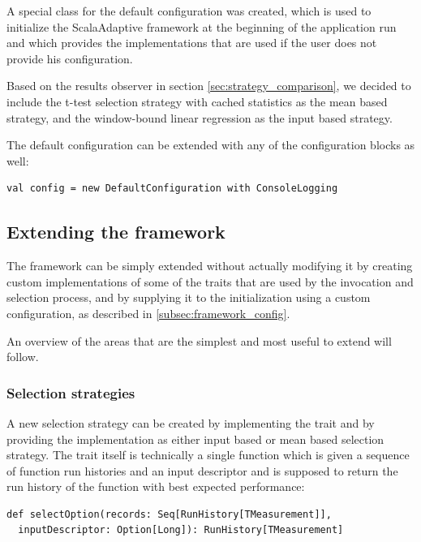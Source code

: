 A special class for the default configuration was created, which is used to initialize the ScalaAdaptive framework at the beginning of the application run and which provides the implementations that are used if the user does not provide his configuration.

Based on the results observer in section \ref{sec:strategy_comparison}, we decided to include the t-test selection strategy with cached statistics as the mean based strategy, and the window-bound linear regression as the input based strategy.

The default configuration can be extended with any of the configuration blocks as well:

\lstset{style=Scala}
\begin{lstlisting}
val config = new DefaultConfiguration with ConsoleLogging
\end{lstlisting}

\subsection{Extending the framework}

The framework can be simply extended without actually modifying it by creating custom implementations of some of the traits that are used by the invocation and selection process, and by supplying it to the  initialization using a custom configuration, as described in \ref{subsec:framework_config}.

An overview of the areas that are the simplest and most useful to extend will follow.

\subsubsection{Selection strategies}

A new selection strategy can be created by implementing the  trait and by providing the implementation as either input based or mean based selection strategy. The trait itself is technically a single function which is given a sequence of function run histories and an input descriptor and is supposed to return the run history of the function with best expected performance:

\lstset{style=Scala}
\begin{lstlisting}
def selectOption(records: Seq[RunHistory[TMeasurement]], 
  inputDescriptor: Option[Long]): RunHistory[TMeasurement]
\end{lstlisting}

